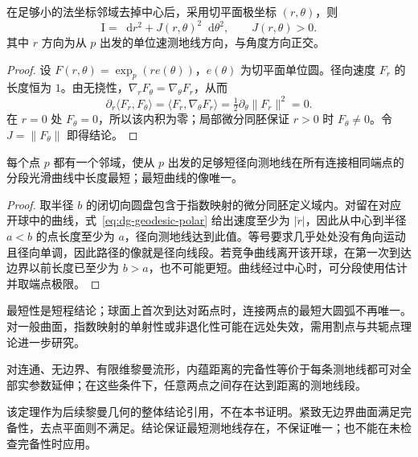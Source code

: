 \documentclass[UTF8,12pt,a4paper,fontset=fandol]{ctexbook}
\newcommand{\dd}{\mathop{}\!\mathrm d}
\newcommand{\ip}[2]{\langle #1,#2\rangle}
\newcommand{\norm}[1]{\lVert #1\rVert}
\begin{document}
\begin{lemma}
在足够小的法坐标邻域去掉中心后，采用切平面极坐标 $(r,\theta)$，则
\begin{equation}
 \mathrm I=\dd r^2+J(r,\theta)^2\dd\theta^2,
 \qquad J(r,\theta)>0.
 \label{eq:dg-geodesic-polar}
\end{equation}
其中 $r$ 方向为从 $p$ 出发的单位速测地线方向，与角度方向正交。
\end{lemma}
\begin{proof}
设 $F(r,\theta)=\exp_p(r e(\theta))$，$e(\theta)$ 为切平面单位圆。径向速度 $F_r$ 的长度恒为 $1$。由无挠性，$\nabla_rF_\theta=\nabla_\theta F_r$，从而
\[
 \partial_r\ip{F_r}{F_\theta}
 =\ip{F_r}{\nabla_\theta F_r}
 =\tfrac12\partial_\theta\norm{F_r}^2=0.
\]
在 $r=0$ 处 $F_\theta=0$，所以该内积为零；局部微分同胚保证 $r>0$ 时 $F_\theta\ne0$。令 $J=\norm{F_\theta}$ 即得结论。
\end{proof}

\begin{theorem}[足够短的测地线实现距离]
每个点 $p$ 都有一个邻域，使从 $p$ 出发的足够短径向测地线在所有连接相同端点的分段光滑曲线中长度最短；最短曲线的像唯一。
\end{theorem}
\begin{proof}
取半径 $b$ 的闭切向圆盘包含于指数映射的微分同胚定义域内。对留在对应开球中的曲线，式~\eqref{eq:dg-geodesic-polar} 给出速度至少为 $|\dot r|$，因此从中心到半径 $a<b$ 的点长度至少为 $a$，径向测地线达到此值。等号要求几乎处处没有角向运动且径向单调，因此路径的像就是径向线段。若竞争曲线离开该开球，在第一次到达边界以前长度已至少为 $b>a$，也不可能更短。曲线经过中心时，可分段使用估计并取端点极限。
\end{proof}
最短性是短程结论；球面上首次到达对跖点时，连接两点的最短大圆弧不再唯一。对一般曲面，指数映射的单射性或非退化性可能在远处失效，需用割点与共轭点理论进一步研究。

\begin{theorem}
对连通、无边界、有限维黎曼流形，内蕴距离的完备性等价于每条测地线都可对全部实参数延伸；在这些条件下，任意两点之间存在达到距离的测地线段。
\end{theorem}
该定理作为后续黎曼几何的整体结论引用，不在本书证明。紧致无边界曲面满足完备性，去点平面则不满足。结论保证最短测地线存在，不保证唯一；也不能在未检查完备性时应用。
\end{document}
